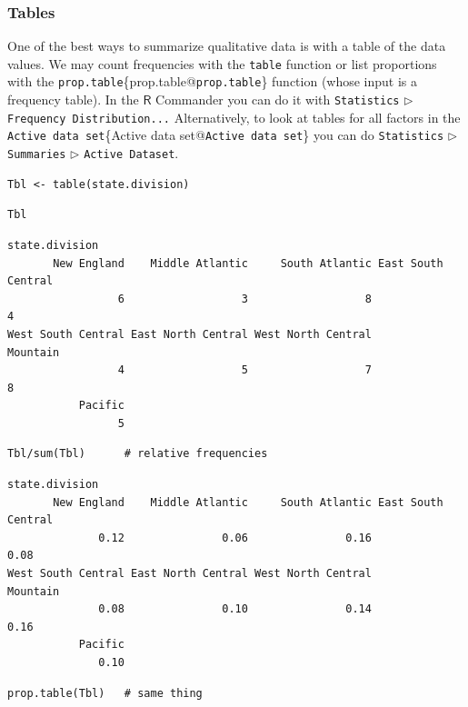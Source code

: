 \documentclass[10pt,english]{scrbook}
\begin{document}
\subsubsection[Tables]{Tables}
\label{sec-1-1-4-1}

One of the best ways to summarize qualitative data is with a table of the data values. We may count frequencies with the \texttt{table} function or list proportions with the \texttt{prop.table}\index\{prop.table@\texttt{prop.table}\} function (whose input is a frequency table). In the \(\mathsf{R}\) Commander you can do it with \texttt{Statistics} \(\triangleright\) \texttt{Frequency Distribution...} Alternatively, to look at tables for all factors in the \texttt{Active data set}\index\{Active data set@\texttt{Active data set}\} you can do \texttt{Statistics} \(\triangleright\) \texttt{Summaries} \(\triangleright\) \texttt{Active Dataset}.

\begin{verbatim}
Tbl <- table(state.division)
\end{verbatim}

\begin{verbatim}
Tbl
\end{verbatim}

\begin{verbatim}
state.division
       New England    Middle Atlantic     South Atlantic East South Central 
                 6                  3                  8                  4 
West South Central East North Central West North Central           Mountain 
                 4                  5                  7                  8 
           Pacific 
                 5
\end{verbatim}

\begin{verbatim}
Tbl/sum(Tbl)      # relative frequencies
\end{verbatim}

\begin{verbatim}
state.division
       New England    Middle Atlantic     South Atlantic East South Central 
              0.12               0.06               0.16               0.08 
West South Central East North Central West North Central           Mountain 
              0.08               0.10               0.14               0.16 
           Pacific 
              0.10
\end{verbatim}

\begin{verbatim}
prop.table(Tbl)   # same thing
\end{verbatim}
\end{document}
